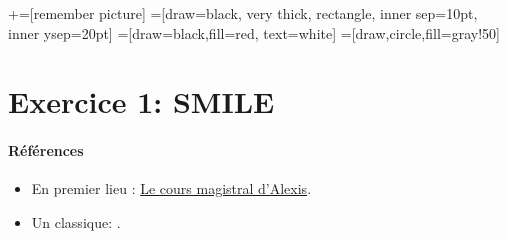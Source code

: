 


\usetikzlibrary{positioning}
\usetikzlibrary{snakes}
\usetikzlibrary{calc}
\usetikzlibrary{arrows}
\usetikzlibrary{decorations.markings}
\usetikzlibrary{shapes.misc}
\usetikzlibrary{matrix,shapes,arrows,fit,tikzmark}
\usetikzlibrary{matrix,chains,positioning,decorations.pathreplacing,arrows}
\usetikzlibrary{shapes}
\usetikzlibrary{shapes.geometric, arrows}
\newcommand\marktopleft[1]{
    \tikz[overlay,remember picture] 
        \node (marker-#1-a) at (-.3em,.3em) {};%
}
\newcommand\markbottomright[2]{%
    \tikz[overlay,remember picture] 
        \node (marker-#1-b) at (0em,0em) {};%
}
+=[remember picture] 
 =[draw=black, very thick, rectangle, inner sep=10pt, inner ysep=20pt]
 =[draw=black,fill=red, text=white]
=[draw,circle,fill=gray!50]

\begin{frame}
\titlepage
\end{frame}
\begin{frame}
 \tableofcontents
    \end{frame}

\section{Exercice 1: SMILE}
\frame{\sectionpage}

\begin{frame}
  [allowframebreaks]{\insertsection}
  \framesubtitle{Références}
  \begin{itemize}
\item En premier lieu : \href{https://cours.univ-grenoble-alpes.fr/course/view.php?id=5945\#section-2}{Le cours magistral d'Alexis}.
\item Un classique: \cite{Tirole_BookIO_1988}.
\end{itemize}

\end{frame}

